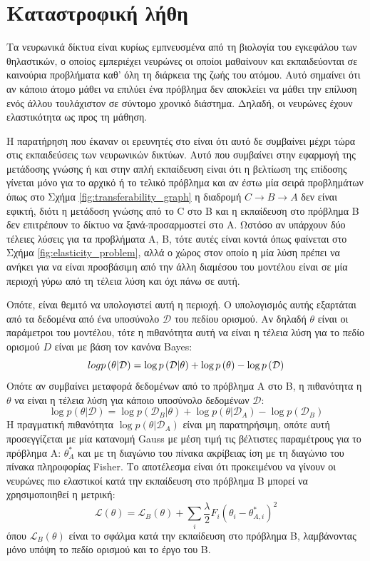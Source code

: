 \section{Καταστροφική λήθη \cite{62}}
\label{section:catastrophicForgetting}
Τα νευρωνικά δίκτυα είναι κυρίως εμπνευσμένα από τη βιολογία του εγκεφάλου των θηλαστικών, ο οποίος εμπεριέχει νευρώνες οι οποίοι μαθαίνουν και εκπαιδεύονται σε καινούρια προβλήματα καθ’ όλη τη διάρκεια της ζωής του ατόμου. Αυτό σημαίνει ότι αν κάποιο άτομο μάθει να επιλύει ένα πρόβλημα δεν αποκλείει να μάθει την επίλυση ενός άλλου τουλάχιστον σε σύντομο χρονικό διάστημα. Δηλαδή, οι νευρώνες έχουν ελαστικότητα ως προς τη μάθηση.

Η παρατήρηση που έκαναν οι ερευνητές στο \cite{62} είναι ότι αυτό δε συμβαίνει μέχρι τώρα στις εκπαιδεύσεις των νευρωνικών δικτύων. Αυτό που συμβαίνει στην εφαρμογή της μετάδοσης γνώσης ή και στην απλή εκπαίδευση είναι ότι η βελτίωση της επίδοσης γίνεται μόνο για το αρχικό ή το τελικό πρόβλημα και αν έστω μία σειρά προβλημάτων όπως στο Σχήμα \ref{fig:transferability_graph} η διαδρομή $C\rightarrow B\rightarrow A$ δεν είναι εφικτή, διότι η μετάδοση γνώσης από το C στο B και η εκπαίδευση στο πρόβλημα B δεν επιτρέπουν το δίκτυο να ξανά-προσαρμοστεί στο A. Ωστόσο αν υπάρχουν δύο τέλειες λύσεις για τα προβλήματα A, B, τότε αυτές είναι κοντά όπως φαίνεται στο Σχήμα \ref{fig:elasticity_problem}, αλλά ο χώρος στον οποίο η μία λύση πρέπει να ανήκει για να είναι προσβάσιμη από την άλλη διαμέσου του μοντέλου είναι σε μία περιοχή γύρω από τη τέλεια λύση και όχι πάνω σε αυτή. 

Οπότε, είναι θεμιτό να υπολογιστεί αυτή η περιοχή. Ο υπολογισμός αυτής εξαρτάται από τα δεδομένα από ένα υποσύνολο  $\mathcal{D}$ του πεδίου ορισμού. Αν δηλαδή $\theta$ είναι οι παράμετροι του μοντέλου, τότε η πιθανότητα αυτή να είναι η τέλεια λύση για το πεδίο ορισμού $D$ είναι με βάση τον κανόνα Bayes:
$$
\\log p\left(\theta | \mathcal{D} \right) =  \log p\left( \mathcal{D}| \theta \right) + \log p\left(\theta \right) - \log p\left(\mathcal{D} \right)
$$
Οπότε αν συμβαίνει μεταφορά δεδομένων από το πρόβλημα A στο B, η πιθανότητα η $\theta$ να είναι η τέλεια λύση για κάποιο υποσύνολο δεδομένων $\mathcal{D}$:
$$
\log p\left(\theta | \mathcal{D} \right) =  \log p\left( \mathcal{D}_B| \theta \right) + \log p\left(\theta | \mathcal{D}_A\right) - \log p\left(\mathcal{D}_B \right)
$$
Η πραγματική πιθανότητα $ \log p\left(\theta | \mathcal{D}_A\right)$ είναι μη παρατηρήσιμη, οπότε αυτή προσεγγίζεται με μία κατανομή Gauss με μέση τιμή τις βέλτιστες παραμέτρους για το πρόβλημα A: $\theta^*_A$ και με τη διαγώνιο του πίνακα ακρίβειας ίση με τη διαγώνιο του πίνακα πληροφορίας Fisher. Το αποτέλεσμα είναι ότι προκειμένου να γίνουν οι νευρώνες πιο ελαστικοί κατά την εκπαίδευση στο πρόβλημα B μπορεί να χρησιμοποιηθεί η μετρική:
$$
\mathcal{L\left(\theta \right)} = \mathcal{L}_{B}\left(\theta \right) + \sum_{i} \frac{\lambda}{2} F_i\left( \theta_i - \theta^*_{A,i}\right)^2
$$
όπου $\mathcal{L}_{B}\left(\theta \right)$ είναι το σφάλμα κατά την εκπαίδευση στο πρόβλημα B, λαμβάνοντας μόνο υπόψη το πεδίο ορισμού και το έργο του B.


